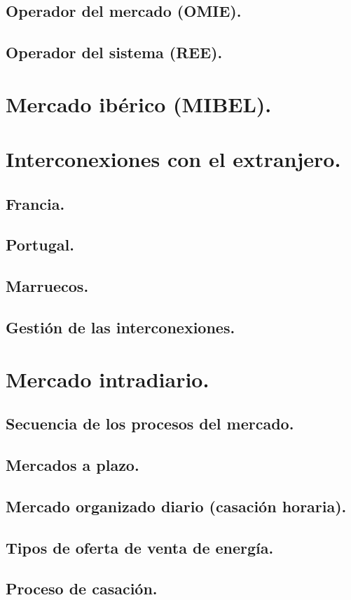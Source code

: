 \subsection{Operador del mercado (OMIE).}
\subsection{Operador del sistema (REE).}
\section{Mercado ibérico (MIBEL).}
\section{Interconexiones con el extranjero.}
\subsection{Francia.}
\subsection{Portugal.}
\subsection{Marruecos.}
\subsection{Gestión de las interconexiones.}
\section{Mercado intradiario.}
\subsection{Secuencia de los procesos del mercado.}
\subsection{Mercados a plazo.}
\subsection{Mercado organizado diario (casación horaria).}
\subsection{Tipos de oferta de venta de energía.}
\subsection{Proceso de casación.}
